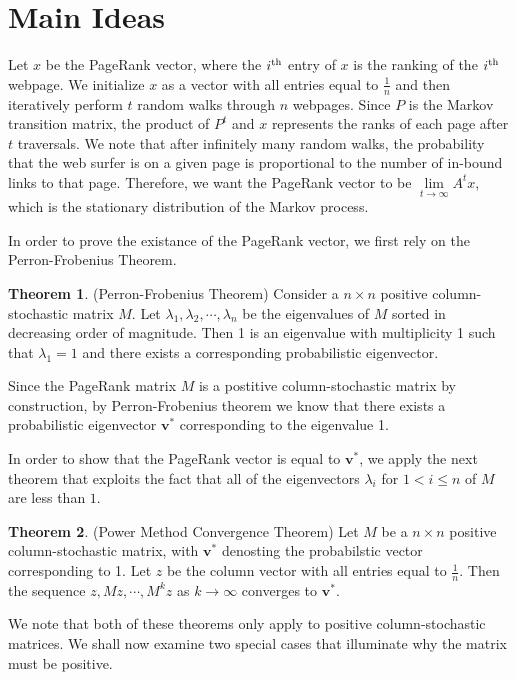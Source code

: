 \documentclass[11pt]{article}
\theoremstyle{definition}
\newtheorem{theorem}{Theorem}
\renewcommand{\vec}[1]{\mathbf{#1}}
\begin{document}
\section{Main Ideas}
Let $x$ be the PageRank vector, where the $i^{\textnormal{th}}$ entry of $x$ is the ranking of the $i^{\textnormal{th}}$ webpage.
We initialize $x$ as a vector with all entries equal to $\frac{1}{n}$ and then iteratively perform $t$ random walks through $n$ webpages.
Since $P$ is the Markov transition matrix, the product of $P^t$ and $x$ represents the ranks of each page after $t$ traversals.
We note that after infinitely many random walks, the probability that the web surfer is on a given page is proportional to the number of in-bound links to that page.
Therefore, we want the PageRank vector to be $\lim\limits_{t\to \infty}{A^tx}$, which is the stationary distribution of the Markov process.

In order to prove the existance of the PageRank vector, we first rely on the Perron-Frobenius Theorem.
\begin{theorem}
    (Perron-Frobenius Theorem) Consider a $n\times n$ positive column-stochastic matrix $M$. Let $\lambda_1, \lambda_2, \cdots, \lambda_n$ be the eigenvalues of $M$ sorted in decreasing order of magnitude. Then 1 is an eigenvalue with multiplicity 1 such that $\lambda_1=1$ and there exists a corresponding probabilistic eigenvector.
\end{theorem}

Since the PageRank matrix $M$ is a postitive column-stochastic matrix by construction, by Perron-Frobenius theorem we know that there exists a probabilistic eigenvector $\vec{v}^*$ corresponding to the eigenvalue 1.

In order to show that the PageRank vector is equal to $\vec{v}^*$, we apply the next theorem that exploits the fact that all of the eigenvectors $\lambda_i$ for $1<i\leq n$ of $M$ are less than $1$.
\begin{theorem}
    (Power Method Convergence Theorem) Let $M$ be a $n\times n$ positive column-stochastic matrix, with $\vec{v}^*$ denosting the probabilstic vector corresponding to 1. Let $z$ be the column vector with all entries equal to $\frac{1}{n}$. Then the sequence $z, Mz, \cdots, M^kz$ as $k\to \infty$ converges to $\vec{v}^*$.    
\end{theorem}

We note that both of these theorems only apply to positive column-stochastic matrices.
We shall now examine two special cases that illuminate why the matrix must be positive.
\end{document}
